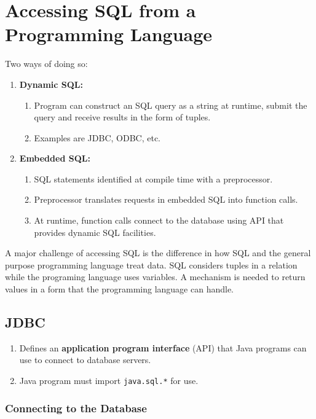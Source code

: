 \documentclass[journal,12pt,twocolumn]{IEEEtran}
\begin{document}
\section{Accessing SQL from a Programming Language}

Two ways of doing so:
\begin{enumerate}
     \item \textbf{Dynamic SQL:}
     \begin{enumerate}
          \item Program can construct an SQL query as a string at runtime,
          submit the query and receive results in the form of tuples.
          \item Examples are JDBC, ODBC, etc.
     \end{enumerate}
     \item \textbf{Embedded SQL:}
     \begin{enumerate}
          \item SQL statements identified at compile time with a preprocessor.
          \item Preprocessor translates requests in embedded SQL into function
          calls.
          \item At runtime, function calls connect to the database using API
          that provides dynamic SQL facilities.
     \end{enumerate}
\end{enumerate}

A major challenge of accessing SQL is the difference in how SQL and the general
purpose programming language treat data. SQL considers tuples in a relation
while the programing language uses variables. A mechanism is needed to return
values in a form that the programming language can handle.

\subsection{JDBC}

\begin{enumerate}
     \item Defines an \textbf{application program interface} (API) that Java
     programs can use to connect to database servers.
     \item Java program must import \texttt{java.sql.*} for use.
\end{enumerate}

\subsubsection{Connecting to the Database}\hfill
\end{document}
